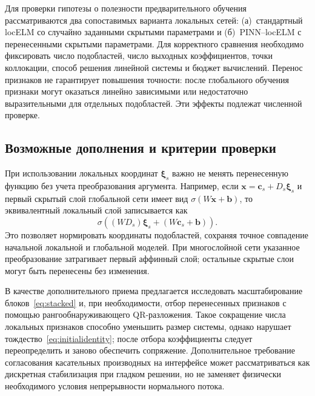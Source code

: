 \documentclass{misisarticle}
\begin{document}
Для проверки гипотезы о полезности предварительного обучения рассматриваются два сопоставимых варианта локальных сетей: (а)~стандартный locELM со случайно заданными скрытыми параметрами и (б)~PINN--locELM с перенесенными скрытыми параметрами. Для корректного сравнения необходимо фиксировать число подобластей, число выходных коэффициентов, точки коллокации, способ решения линейной системы и бюджет вычислений. Перенос признаков не гарантирует повышения точности: после глобального обучения признаки могут оказаться линейно зависимыми или недостаточно выразительными для отдельных подобластей. Эти эффекты подлежат численной проверке.

\subsection{Возможные дополнения и критерии проверки}

При использовании локальных координат $\boldsymbol\xi_s$ важно не менять перенесенную функцию без учета преобразования аргумента. Например, если $\mathbf{x}=\mathbf c_s+D_s\boldsymbol\xi_s$ и первый скрытый слой глобальной сети имеет вид $\sigma(W\mathbf{x}+\mathbf b)$, то эквивалентный локальный слой записывается как
\begin{equation}
 \sigma\!\left((WD_s)\boldsymbol\xi_s
 +(W\mathbf c_s+\mathbf b)\right).
\label{eq:coordtrans}
\end{equation}
Это позволяет нормировать координаты подобластей, сохраняя точное совпадение начальной локальной и глобальной моделей. При многослойной сети указанное преобразование затрагивает первый аффинный слой; остальные скрытые слои могут быть перенесены без изменения.

В качестве дополнительного приема предлагается исследовать масштабирование блоков~\eqref{eq:stacked} и, при необходимости, отбор перенесенных признаков с помощью рангообнаруживающего QR-разложения. Такое сокращение числа локальных признаков способно уменьшить размер системы, однако нарушает тождество~\eqref{eq:initialidentity}; после отбора коэффициенты следует переопределить и заново обеспечить сопряжение. Дополнительное требование согласования касательных производных на интерфейсе может рассматриваться как дискретная стабилизация при гладком решении, но не заменяет физически необходимого условия непрерывности нормального потока.
\end{document}
